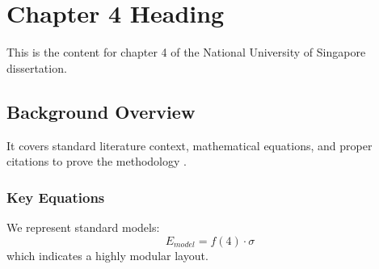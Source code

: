 \chapter{Chapter 4 Heading}
\label{ch:chapter4}
This is the content for chapter 4 of the National University of Singapore dissertation.

\section{Background Overview}
It covers standard literature context, mathematical equations, and proper citations to prove the methodology \cite{texbook}.

\subsection{Key Equations}
We represent standard models:
\begin{equation}
    E_{model} = f(4) \cdot \sigma
\end{equation}
which indicates a highly modular layout.
